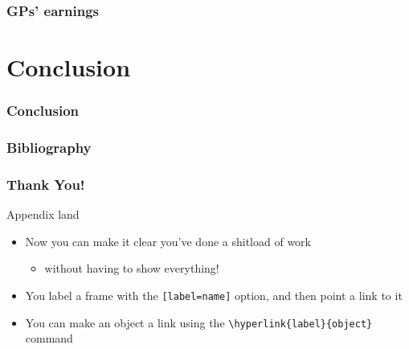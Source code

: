 \documentclass[12pt, aspectratio=169]{beamer}
\begin{document}

\begin{frame}
\frametitle{GPs' earnings}

\centerline{
}

\end{frame}


\section{Conclusion}

\begin{frame}
\frametitle{Conclusion}
\end{frame}

\begin{frame}[t]\frametitle{Bibliography}
\printbibliography
\end{frame}

\begin{frame}
\frametitle{Thank You!}
\end{frame}


\appendix
\begin{frame}[label=appendix_end]{Appendix land}
  \begin{itemize}
    \item[] Now you can make it clear you've done a shitload of work
      \begin{itemize}
      \item[]  without having to show everything! \hyperlink{data_slide}{}
      \end{itemize}
    \item[] You label a frame with the \texttt{[label=name]} option, and then point a link to it
    \item[] You can make an object a link using the \texttt{\textbackslash hyperlink\{label\}\{object\}} command
  \end{itemize}
\end{frame}
\end{document}
